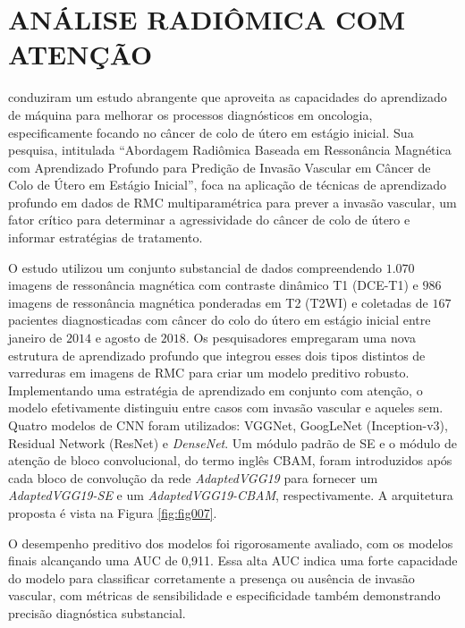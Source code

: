 \section{ANÁLISE RADIÔMICA COM ATENÇÃO}
\label{sec:analise_radiomica_com_atencao}

 conduziram um estudo abrangente que aproveita as capacidades do aprendizado de máquina para melhorar os processos diagnósticos em oncologia, especificamente focando no câncer de colo de útero em estágio inicial. Sua pesquisa, intitulada ``Abordagem Radiômica Baseada em Ressonância Magnética com Aprendizado Profundo para Predição de Invasão Vascular em Câncer de Colo de Útero em Estágio Inicial'', foca na aplicação de técnicas de aprendizado profundo em dados de \gls{RMC} multiparamétrica para prever a invasão vascular, um fator crítico para determinar a agressividade do câncer de colo de útero e informar estratégias de tratamento.

O estudo utilizou um conjunto substancial de dados compreendendo $1.070$ imagens de ressonância magnética com contraste dinâmico T1 (DCE-T1) e $986$ imagens de ressonância magnética ponderadas em T2 (T2WI) e coletadas de $167$ pacientes diagnosticadas com câncer do colo do útero em estágio inicial entre janeiro de $2014$ e agosto de $2018$. Os pesquisadores empregaram uma nova estrutura de aprendizado profundo que integrou esses dois tipos distintos de varreduras em imagens de \gls{RMC} para criar um modelo preditivo robusto. Implementando uma estratégia de aprendizado em conjunto com atenção, o modelo efetivamente distinguiu entre casos com invasão vascular e aqueles sem. Quatro modelos de CNN foram utilizados: VGGNet, GoogLeNet (Inception-v3), Residual Network (ResNet) e \textit{DenseNet}. Um módulo padrão de \gls{SE}  e o módulo de atenção de bloco convolucional, do termo inglês \gls{CBAM},  foram introduzidos após cada bloco de convolução da rede \textit{AdaptedVGG19} para fornecer um \textit{AdaptedVGG19-SE} e um \textit{AdaptedVGG19-CBAM}, respectivamente. A arquitetura proposta é vista na Figura \ref{fig:fig007}.

O desempenho preditivo dos modelos foi rigorosamente avaliado, com os modelos finais alcançando uma \gls{AUC} de 0,911. Essa alta \gls{AUC} indica uma forte capacidade do modelo para classificar corretamente a presença ou ausência de invasão vascular, com métricas de sensibilidade e especificidade também demonstrando precisão diagnóstica substancial.

